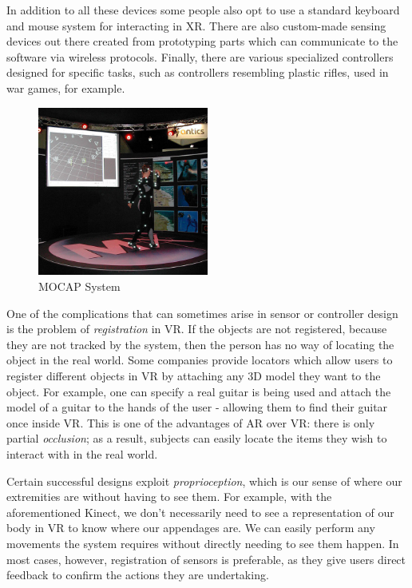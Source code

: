 In addition to all these devices some people also opt to use a standard keyboard and mouse system for interacting in XR. There are also custom-made sensing devices out there created from prototyping parts which can communicate to the software via wireless protocols. Finally, there are various specialized controllers designed for specific tasks, such as controllers resembling plastic rifles, used in war games, for example.

\begin{figure}[ht!]%
\centering
\includegraphics[width=0.5\textwidth]{img/mocap.jpg} 
\caption{MOCAP System \cite{FileMoti99online}}
\label{img:mocap}
\end{figure}

One of the complications that can sometimes arise in sensor or controller design is the problem of \textit{registration} in VR. If the objects are not registered, because they are not tracked by the system, then the person has no way of locating the object in the real world. Some companies provide locators which allow users to register different objects in VR by attaching any 3D model they want to the object. For example, one can specify a real guitar is being used and attach the model of a guitar to the hands of the user - allowing them to find their guitar once inside VR. This is one of the advantages of AR over VR: there is only partial \textit{occlusion}; as a result, subjects can easily locate the items they wish to interact with in the real world.

Certain successful designs exploit \textit{proprioception}, which is our sense of where our extremities are without having to see them. For example, with the aforementioned Kinect, we don't necessarily need to see a representation of our body in VR to know where our appendages are. We can easily perform any movements the system requires without directly needing to see them happen. In most cases, however, registration of sensors is preferable, as they give users direct feedback to confirm the actions they are undertaking. 

